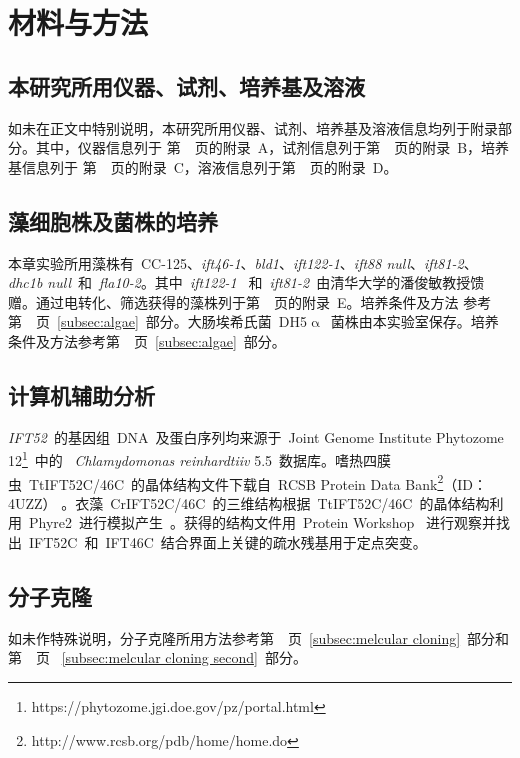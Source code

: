 \section{材料与方法}
\subsection{本研究所用仪器、试剂、培养基及溶液}
如未在正文中特别说明，本研究所用仪器、试剂、培养基及溶液信息均列于附录部分。其中，仪器信息列于
第\ \pageref{appen:A}\ 页的附录\ A，试剂信息列于第\ \pageref{appen:B}\ 页的附录\ B，培养基信息列于
第\ \pageref{appen:C}\ 页的附录\ C，溶液信息列于第\ \pageref{appen:D}\ 页的附录\ D。

\subsection{藻细胞株及菌株的培养}
本章实验所用藻株有\ CC-125、\textit{ift46-1}、\textit{bld1}、\textit{ift122-1}、\textit{ift88 null}、\textit{ift81-2}、\textit{dhc1b null}\ 和\ \textit{fla10-2}。其中\ \textit{ift122-1} \ 和\ \textit{ift81-2}\ 由清华大学的潘俊敏教授馈赠。通过电转化、筛选获得的藻株列于第\
\pageref{appen:E}\ 页的附录\ E。培养条件及方法
参考第\ \pageref{subsec:algae}\ 页\ \ref{subsec:algae}\ 部分。大肠埃希氏菌\ DH5$\upalpha$\ 菌株由本实验室保存。培养条件及方法参考第\ \pageref{subsec:algae}\ 页\
\ref{subsec:algae}\ 部分。

\subsection{计算机辅助分析}
\textit{IFT52}\ 的基因组\ DNA\ 及蛋白序列均来源于\ Joint Genome Institute Phytozome 12\footnote{https://phytozome.jgi.doe.gov/pz/portal.html}\ 中的
\ \textit{Chlamydomonas reinhardtiiv} 5.5\ 数据库。嗜热四膜虫\ TtIFT52C/46C\ 的晶体结构文件下载自\ RCSB Protein Data Bank\footnote{http://www.rcsb.org/pdb/home/home.do}（ID：4UZZ）
\citep{Taschner2014}。衣藻\ CrIFT52C/46C\ 的三维结构根据\ TtIFT52C/46C\ 的晶体结构利用\ Phyre2\ 进行模拟产生\ \citep{Kelley2015}。获得的结构文件用\ Protein Workshop
\citep{Moreland2005,Xu2009}\ 进行观察并找出\ IFT52C\ 和\ IFT46C\ 结合界面上关键的疏水残基用于定点突变。

\subsection{分子克隆}
如未作特殊说明，分子克隆所用方法参考第\ \pageref{subsec:melcular cloning}\ 页\
\ref{subsec:melcular cloning}\ 部分和第\ \pageref{subsec:melcular cloning second}\ 页
\ \ref{subsec:melcular cloning second}\ 部分。

